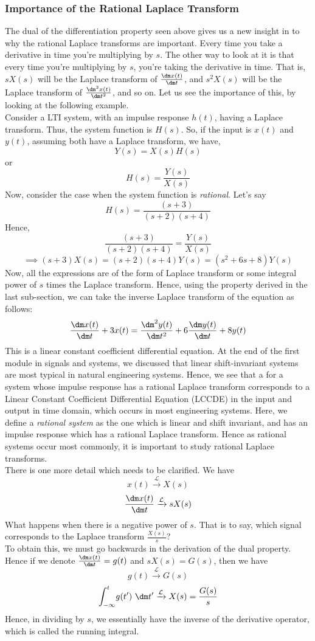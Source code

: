 \subsubsection{Importance of the Rational Laplace Transform}
The dual of the differentiation property seen above gives us a new insight in to why the rational Laplace transforms are important. Every time you take a derivative in time you're multiplying by $s$. The other way to look at it is that every time you're multiplying by $s$, you're taking the derivative in time. That is, $sX(s)$ will be the Laplace transform of $\frac{\dm x(t)}{\dm t}$, and $s^2X(s)$ will be the Laplace transform of $\frac{\dm^2 x(t)}{\dm t^2}$, and so on. Let us see the importance of this, by looking at the following example.\\
Consider a LTI system, with an impulse response $h(t)$, having a Laplace transform. Thus, the system function is $H(s)$. So, if the input is $x(t)$ and $y(t)$, assuming both have a Laplace transform, we have,
\[
Y(s)=X(s)H(s)
\]
or
\[
H(s)=\frac{Y(s)}{X(s)}
\]
Now, consider the case when the system function is \emph{rational}. Let's say
\[
H(s)=\frac{(s+3)}{(s+2)(s+4)}
\]
Hence,
\[
\frac{(s+3)}{(s+2)(s+4)} = \frac{Y(s)}{X(s)}
\]
\[
\implies (s+3)X(s) = (s+2)(s+4)Y(s)=(s^2+6s+8)Y(s)
\]
Now, all the expressions are of the form of Laplace transform or some integral power of $s$ times the Laplace transform. Hence, using the property derived in the last sub-section, we can take the inverse Laplace transform of the equation as follows:
\[
\frac{\dm x(t)}{\dm t} + 3x(t) = \frac{\dm^2 y(t)}{\dm t^2}+6\frac{\dm y(t)}{\dm t} + 8y(t)
\]
This is a linear constant coefficient differential equation. At the end of the first module in signals and systems, we discussed that linear shift-invariant systems are most typical in natural engineering systems. Hence, we see that a for a system whose impulse response has a rational Laplace transform corresponds to a Linear Constant Coefficient Differential Equation (LCCDE) in the input and output in time domain, which occurs in most engineering systems. Here, we define a \emph{rational system} as the one which is linear and shift invariant, and has an impulse response which has a rational Laplace transform. Hence as rational systems occur most commonly, it is important to study rational Laplace transforms.\\
There is one more detail which needs to be clarified. We have
\[
x(t) \xrightarrow{\mathcal{L}} X(s)
\]
\[
\frac{\dm x(t)}{\dm t} \xrightarrow{\mathcal{L}} sX(s)
\]
What happens when there is a negative power of $s$. That is to say, which signal corresponds to the Laplace transform $\frac{X(s)}{s}$?\\
To obtain this, we must go backwards in the derivation of the dual property. Hence if we denote $\frac{\dm x(t)}{\dm t}=g(t)$ and $sX(s)=G(s)$, then we have
\[
g(t) \xrightarrow{\mathcal{L}} G(s)
\]
\[
\int_{-\infty}^t \! g(t') \ \dm t' \xrightarrow{\mathcal{L}} X(s) = \frac{G(s)}{s}
\]
Hence, in dividing by $s$, we essentially have the inverse of the derivative operator, which is called the running integral.

